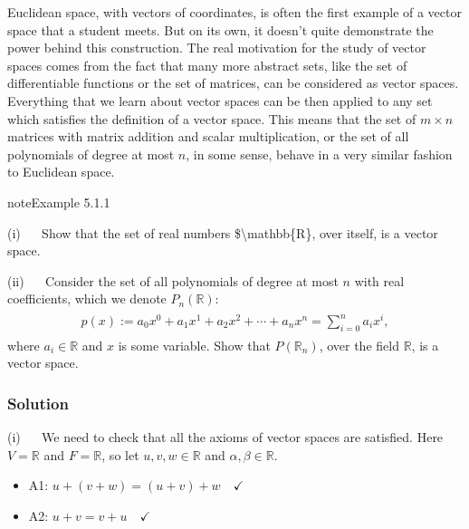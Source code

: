 \documentclass[letterpaper,10pt,english]{jupyterBook}
\begin{document}
\sphinxAtStartPar
Euclidean space, with vectors of coordinates, is often the first example of a vector space that a student meets. But on its own, it doesn’t quite demonstrate the power behind this construction. The real motivation for the study of vector spaces comes from the fact that many more abstract sets, like the set of differentiable functions or the set of matrices, can be considered as vector spaces. Everything that we learn about vector spaces can be then applied to any set which satisfies the definition of a vector space. This means that the set of \(m\times n\) matrices with matrix addition and scalar multiplication, or the set of all polynomials of degree at most \(n\), in some sense, behave in a very similar fashion to Euclidean space.
\label{_pages/5.1_Vector_spaces_definitions:real-numbers-vector-space-example}
\begin{sphinxadmonition}{note}{Example 5.1.1}



\sphinxAtStartPar
(i)   Show that the set of real numbers \$\textbackslash{}mathbb\{R\}, over itself, is a vector space.

\sphinxAtStartPar
(ii)   Consider the set of all polynomials of degree at most \(n\) with real coefficients, which we denote \(P_n(\mathbb{R})\):
\begin{equation*}
\begin{split} \begin{align*}
    p(x) := a_0x^0 + a_1x^1 + a_2x^2 + \cdots + a_nx^n = \sum_{i=0}^n a_ix^i,
\end{align*} \end{split}
\end{equation*}
\sphinxAtStartPar
where \(a_i \in \mathbb{R}\) and \(x\) is some variable. Show that \(P(\mathbb{R}_n)\), over the field \(\mathbb{R}\), is a vector space.
\subsubsection*{Solution}

\sphinxAtStartPar
(i)   We need to check that all the axioms of vector spaces are satisfied. Here \(V = \mathbb{R}\) and \(F = \mathbb{R}\), so let \(u, v, w \in \mathbb{R}\) and \(\alpha, \beta \in \mathbb{R}\).
\begin{itemize}
\item {} 
\sphinxAtStartPar
A1: \(u + (v + w) = (u + v) + w \quad \checkmark\)

\item {} 
\sphinxAtStartPar
A2: \(u + v = v + u \quad \checkmark\)


\end{itemize}
\end{sphinxadmonition}
\end{document}

